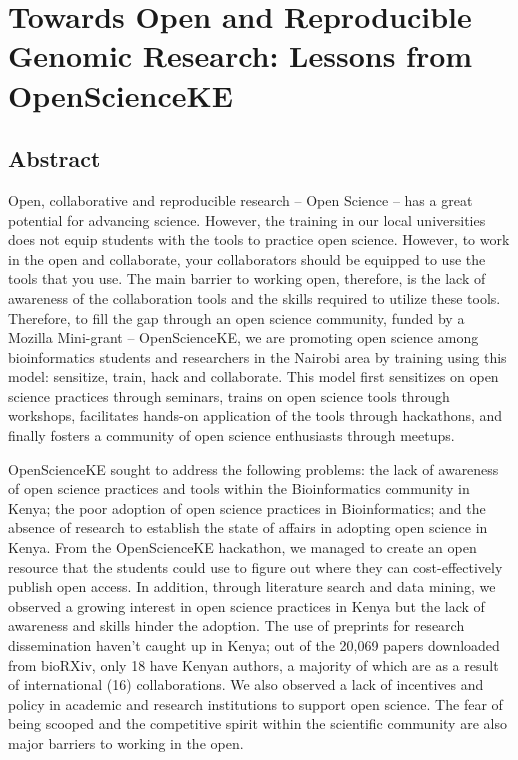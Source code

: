 \section{Towards Open and Reproducible Genomic Research: Lessons from
OpenScienceKE}\label{towards-open-and-reproducible-genomic-research-lessons-from-openscienceke}

\subsection*{Abstract}\label{abstract}

Open, collaborative and reproducible research -- Open Science -- has a
great potential for advancing science. However, the training in our
local universities does not equip students with the tools to practice
open science. However, to work in the open and collaborate, your
collaborators should be equipped to use the tools that you use. The main
barrier to working open, therefore, is the lack of awareness of the
collaboration tools and the skills required to utilize these tools.
Therefore, to fill the gap through an open science community, funded by
a Mozilla Mini-grant -- OpenScienceKE, we are promoting open science
among bioinformatics students and researchers in the Nairobi area by
training using this model: sensitize, train, hack and collaborate. This
model first sensitizes on open science practices through seminars,
trains on open science tools through workshops, facilitates hands-on
application of the tools through hackathons, and finally fosters a
community of open science enthusiasts through meetups.

OpenScienceKE sought to address the following problems: the lack of
awareness of open science practices and tools within the Bioinformatics
community in Kenya; the poor adoption of open science practices in
Bioinformatics; and the absence of research to establish the state of
affairs in adopting open science in Kenya. From the OpenScienceKE
hackathon, we managed to create an open resource that the students could
use to figure out where they can cost-effectively publish open access.
In addition, through literature search and data mining, we observed a
growing interest in open science practices in Kenya but the lack of
awareness and skills hinder the adoption. The use of preprints for
research dissemination haven't caught up in Kenya; out of the 20,069
papers downloaded from bioRXiv, only 18 have Kenyan authors, a majority
of which are as a result of international (16) collaborations. We also
observed a lack of incentives and policy in academic and research
institutions to support open science. The fear of being scooped and the
competitive spirit within the scientific community are also major
barriers to working in the open.

